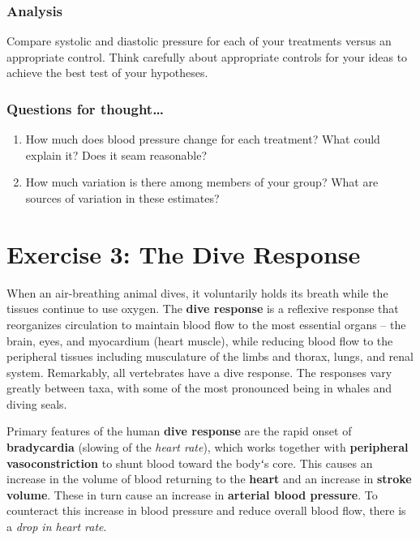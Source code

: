 \documentclass[
  letterpaper,
  DIV=11,
  numbers=noendperiod,
  oneside]{scrartcl}
\providecommand{\tightlist}{%
  \setlength{\itemsep}{0pt}\setlength{\parskip}{0pt}}\usepackage{longtable,booktabs,array}
\begin{document}
\hypertarget{analysis}{%
\subsubsection{Analysis}\label{analysis}}

Compare systolic and diastolic pressure for each of your treatments
versus an appropriate control. Think carefully about appropriate
controls for your ideas to achieve the best test of your hypotheses.

\hypertarget{questions-for-thought-1}{%
\subsubsection{Questions for
thought\ldots{}}\label{questions-for-thought-1}}

\begin{enumerate}
\def\labelenumi{\arabic{enumi}.}
\tightlist
\item
  How much does blood pressure change for each treatment? What could
  explain it? Does it seam reasonable?
\item
  How much variation is there among members of your group? What are
  sources of variation in these estimates?
\end{enumerate}

\hypertarget{exercise-3-the-dive-response}{%
\section{Exercise 3: The Dive
Response}\label{exercise-3-the-dive-response}}

When an air-breathing animal dives, it voluntarily holds its breath
while the tissues continue to use oxygen. The \textbf{dive response} is
a reflexive response that reorganizes circulation to maintain blood flow
to the most essential organs -- the brain, eyes, and myocardium (heart
muscle), while reducing blood flow to the peripheral tissues including
musculature of the limbs and thorax, lungs, and renal system.
Remarkably, all vertebrates have a dive response. The responses vary
greatly between taxa, with some of the most pronounced being in whales
and diving seals.

Primary features of the human \textbf{dive response} are the rapid onset
of \textbf{bradycardia} (slowing of the \emph{heart rate}), which works
together with \textbf{peripheral vasoconstriction} to shunt blood toward
the bodyʻs core. This causes an increase in the volume of blood
returning to the \textbf{heart} and an increase in \textbf{stroke
volume}. These in turn cause an increase in \textbf{arterial blood
pressure}. To counteract this increase in blood pressure and reduce
overall blood flow, there is a \emph{drop in heart rate}.
\end{document}

